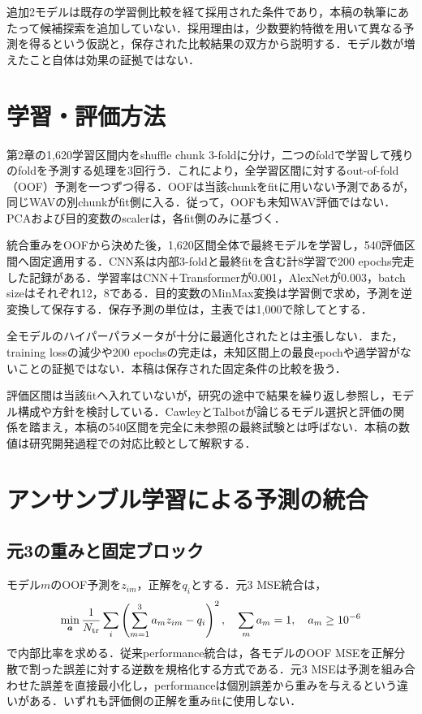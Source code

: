 追加2モデルは既存の学習側比較を経て採用された条件\cite{localInput}であり，本稿の執筆にあたって候補探索を追加していない．採用理由は，少数要約特徴を用いて異なる予測を得るという仮説と，保存された比較結果の双方から説明する．モデル数が増えたこと自体は効果の証拠ではない．

\section{学習・評価方法}
第2章の1,620学習区間内をshuffle chunk 3-foldに分け，二つのfoldで学習して残りのfoldを予測する処理を3回行う．これにより，全学習区間に対するout-of-fold（OOF）予測を一つずつ得る．OOFは当該chunkをfitに用いない予測であるが，同じWAVの別chunkがfit側に入る．従って，OOFも未知WAV評価ではない．PCAおよび目的変数のscalerは，各fit側のみに基づく．

統合重みをOOFから決めた後，1,620区間全体で最終モデルを学習し，540評価区間へ固定適用する．CNN系は内部3-foldと最終fitを含む計8学習で200 epochs完走した記録がある．学習率はCNN＋Transformerが0.001，AlexNetが0.003，batch sizeはそれぞれ12，8である\cite{localMainRun}．目的変数のMinMax変換は学習側で求め，予測を逆変換して保存する．保存予測の単位は\wm{}，主表では1,000で除して\kw{}とする．

全モデルのハイパーパラメータが十分に最適化されたとは主張しない．また，training lossの減少や200 epochsの完走は，未知区間上の最良epochや過学習がないことの証拠ではない．本稿は保存された固定条件の比較を扱う．

評価区間は当該fitへ入れていないが，研究の途中で結果を繰り返し参照し，モデル構成や方針を検討している．CawleyとTalbot\cite{cawley2010}が論じるモデル選択と評価の関係を踏まえ，本稿の540区間を完全に未参照の最終試験とは呼ばない．本稿の数値は研究開発過程での対応比較として解釈する．

\section{アンサンブル学習による予測の統合}
\subsection{元3の重みと固定ブロック}
モデル$m$のOOF予測を$z_{im}$，正解を$q_i$とする．元3 MSE統合は，
\begin{equation}\label{eq:core}
 \min_{\bm a}\frac{1}{N_{\rm tr}}\sum_i\left(\sum_{m=1}^{3}a_mz_{im}-q_i\right)^2,
 \quad\sum_ma_m=1,\quad a_m\ge10^{-6}
\end{equation}
で内部比率を求める．従来performance統合は，各モデルのOOF MSEを正解分散で割った誤差に対する逆数を規格化する方式である．元3 MSEは予測を組み合わせた誤差を直接最小化し，performanceは個別誤差から重みを与えるという違いがある．いずれも評価側の正解を重みfitに使用しない．

